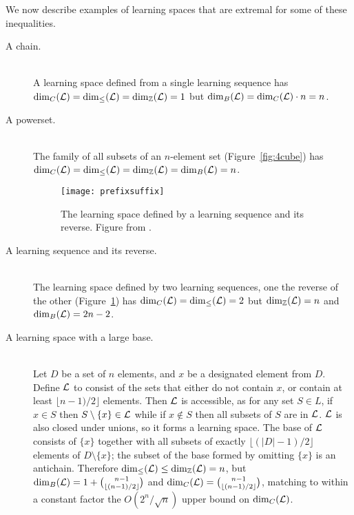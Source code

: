 \documentclass[11pt]{llncs}
\def\Zee{\ensuremath{\Bbb Z}}
\begin{document}
{\noindent
We now describe examples of learning spaces that are extremal for some of these inequalities.

\begin{description}
\item[A chain.] \hfill\\
A learning space defined from a single learning sequence has
${\rm dim}_C({\cal L})={\rm dim}_\le({\cal L})={\rm dim}_\Zee({\cal L})=1$ but
${\rm dim}_B({\cal L})={\rm dim}_C({\cal L})\cdot n=n$.

\item[A powerset.] \hfill\\
The family of all subsets of an $n$-element set (Figure~\ref{fig:4cube}) has ${\rm dim}_C({\cal L})={\rm dim}_\le({\cal L})={\rm dim}_\Zee({\cal L})={\rm dim}_B({\cal L})=n$.

\begin{figure}[t]
\centering\texttt{[image: prefixsuffix]}
\caption{The learning space defined by a learning sequence and its reverse. Figure from \citet{eppst06}.}
\label{fig:prefixsuffix}
\end{figure}

\item[A learning sequence and its reverse.] \hfill\\
The learning space defined by two learning sequences, one the reverse of the other
(Figure~\ref{fig:prefixsuffix}) has
${\rm dim}_C({\cal L})={\rm dim}_\le({\cal L})=2$ but
${\rm dim}_\Zee({\cal L})=n$ and ${\rm dim}_B({\cal L})=2n-2$.

\item[A learning space with a large base.] \hfill\\
Let $D$ be a set of $n$ elements, and $x$ be a designated element from $D$.
Define $\cal L$ to consist of the sets that either do not contain $x$, or
contain at least $\lfloor n-1)/2\rfloor$ elements.
Then $\cal L$ is accessible, as for any set $S\in L$, if $x\in S$ then $S\setminus\{x\}\in\cal L$
while if $x\notin S$ then all subsets of $S$ are in $\cal L$.
$\cal L$ is also closed under unions, so it forms  a learning space.
The base of $\cal L$ consists of $\{x\}$ together with all subsets of exactly
$\lfloor (|D|-1)/2\rfloor$ elements of $D\setminus\{x\}$; the subset of the base formed by omitting $\{x\}$ is an antichain.
Therefore ${\rm dim}_\le({\cal L})\le{\rm dim}_\Zee({\cal L})=n$,
but ${\rm dim}_B({\cal L})=1+{n-1 \choose \lfloor (n-1)/2 \rfloor}$ and
${\rm dim}_C({\cal L})={n-1 \choose \lfloor (n-1)/2 \rfloor}$, matching to within a constant factor the $O(2^n/\sqrt n)$ upper bound on ${\rm dim}_C({\cal L})$.


\end{description}}
\end{document}
